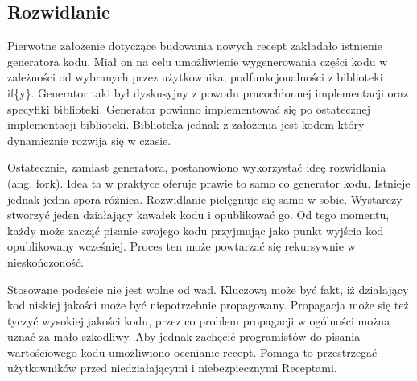\documentclass[11pt,a4paper,polish,thesis]{dcsbook}
\begin{document}
\subsection{Rozwidlanie}
Pierwotne założenie dotyczące budowania nowych recept zakładało istnienie generatora kodu. Miał on na celu umożliwienie wygenerowania części kodu w zależności od
wybranych przez użytkownika, podfunkcjonalności z biblioteki if\{y\}. Generator taki był dyskusyjny z powodu pracochłonnej implementacji oraz specyfiki biblioteki.
Generator powinno implementować się po ostatecznej implementacji biblioteki. Biblioteka jednak z założenia jest kodem który dynamicznie rozwija się w czasie.

Ostatecznie, zamiast generatora, postanowiono wykorzystać ideę rozwidlania (ang. fork). Idea ta w praktyce oferuje prawie to samo co generator kodu. Istnieje jednak
jedna spora różnica. Rozwidlanie pielęgnuje się samo w sobie. Wystarczy stworzyć jeden działający kawałek kodu i opublikować go. Od tego momentu, każdy może zacząć pisanie swojego kodu przyjmując jako punkt wyjścia kod opublikowany wcześniej. Proces ten może powtarzać się rekursywnie w nieskończoność.

Stosowane podeście nie jest wolne od wad. Kluczową może być fakt, iż działający kod niskiej jakości może być niepotrzebnie propagowany. Propagacja może się też tyczyć
wysokiej jakości kodu, przez co problem propagacji w ogólności można uznać za mało szkodliwy. Aby jednak zachęcić programistów do pisania wartościowego kodu umożliwiono ocenianie recept. Pomaga to przestrzegać użytkowników przed niedziałającymi i niebezpiecznymi Receptami.
\end{document}

